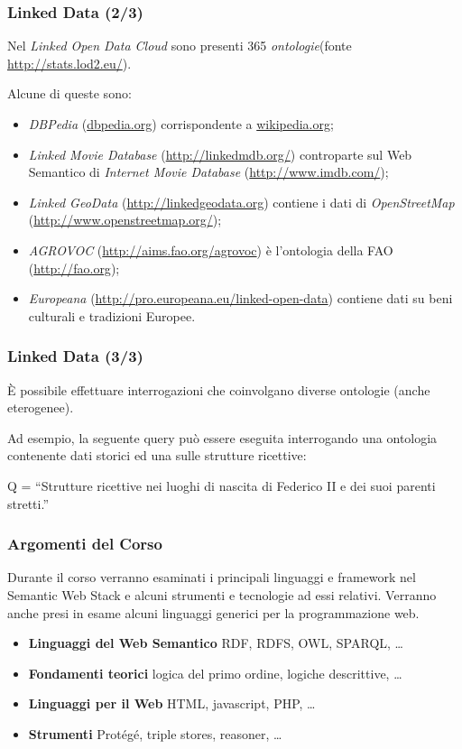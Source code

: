 \documentclass[8pt]{beamer}
\begin{document}
\begin{frame}
\frametitle{Linked Data (2/3)}
Nel \emph{Linked Open Data Cloud} sono presenti 365
\emph{ontologie}(fonte \url{http://stats.lod2.eu/}).
\vspace{\baselineskip}

Alcune di queste sono:
\begin{itemize}
 \item \emph{DBPedia} (\url{dbpedia.org}) corrispondente a \url{wikipedia.org};
 \item \emph{Linked Movie Database} (\url{http://linkedmdb.org/}) controparte sul Web Semantico di \emph{Internet Movie Database} 
 (\url{http://www.imdb.com/});
 \item \emph{Linked GeoData} (\url{http://linkedgeodata.org}) 
  contiene i dati di \emph{OpenStreetMap} (\url{http://www.openstreetmap.org/});
  \item \emph{AGROVOC} (\url{http://aims.fao.org/agrovoc}) \`e l'ontologia della
  FAO (\url{http://fao.org});
  \item \emph{Europeana} (\url{http://pro.europeana.eu/linked-open-data}) contiene dati su beni culturali e tradizioni Europee. 
\end{itemize}
\end{frame}

\begin{frame}
\frametitle{Linked Data (3/3)}
\`E possibile effettuare interrogazioni che coinvolgano diverse
ontologie (anche eterogenee).
\vspace{\baselineskip}

Ad esempio, la seguente query pu\`o essere eseguita
interrogando una ontologia contenente dati storici ed una 
sulle strutture ricettive:


\begin{center}
Q = “Strutture ricettive nei luoghi di nascita di Federico II e dei suoi parenti stretti.”
\end{center}
\end{frame}

\begin{frame}
\frametitle{Argomenti del Corso}

Durante il corso verranno esaminati i principali linguaggi e framework nel
Semantic Web Stack e alcuni strumenti e tecnologie ad essi relativi. Verranno
anche presi in esame alcuni linguaggi generici per la programmazione web.

\begin{itemize}[<+->]
  \item \textbf{Linguaggi del Web Semantico} RDF, RDFS, OWL, SPARQL, \ldots
  \item \textbf{Fondamenti teorici} logica del primo ordine, logiche
  descrittive, \ldots 
  \item \textbf{Linguaggi per il Web} HTML, javascript, PHP, \ldots
  \item \textbf{Strumenti} Prot\'eg\'e, triple stores, reasoner, \ldots 
\end{itemize}

\end{frame}
\end{document}
